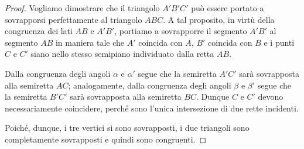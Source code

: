 \begin{proof}
Vogliamo dimostrare che il triangolo $A'B'C'$ può essere portato a sovrapporsi perfettamente al triangolo $ABC$.
A tal proposito, in virtù della congruenza dei lati $AB$ e $A'B'$, portiamo a sovrapporre il segmento $A'B'$ al segmento $AB$ in maniera tale che $A'$ coincida con $A$, $B'$ coincida con $B$ e i punti $C$ e $C'$ siano nello stesso semipiano individuato dalla retta $AB$. 

Dalla congruenza degli angoli $\alpha$ e $\alpha'$ segue che la semiretta $A'C'$ sarà sovrapposta alla semiretta $AC$; analogamente, dalla congruenza degli angoli $\beta$ e $\beta'$ segue che la semiretta $B'C'$ sarà sovrapposta alla semiretta $BC$. Dunque $C$ e $C'$ devono necessariamente coincidere, perché sono l'unica intersezione di due rette incidenti.

Poiché, dunque, i tre vertici si sono sovrapposti, i due triangoli sono completamente sovrapposti e quindi sono congruenti.
\end{proof}


